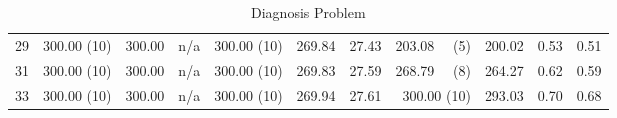 \documentclass[11pt,fleqn,twoside]{article}
\begin{document}
\begin{table}[t]
\begin{tabular}[t]{|r|r|r|r|r|r|r|r|r|r|r|}
29      & 300.00 (10) & 300.00     & n/a     & 300.00 (10) & 269.84     & 27.43     & 203.08 ~~(5) & 200.02     & 0.53     & 0.51     \\
31      & 300.00 (10) & 300.00     & n/a     & 300.00 (10) & 269.83     & 27.59     & 268.79 ~~(8) & 264.27     & 0.62     & 0.59     \\
33      & 300.00 (10) & 300.00     & n/a     & 300.00 (10) & 269.94     & 27.61     & 300.00 (10) & 293.03     & 0.70     & 0.68     \\
					\hline
				\end{tabular}
				\caption{Diagnosis Problem}
				\label{tab:diagnosis}
			\end{table}
\end{document}
